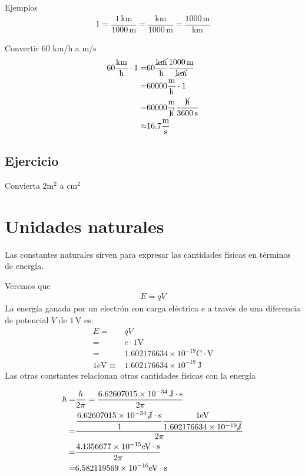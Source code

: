 \documentclass[11pt,a4paper]{book}
\begin{document}
Ejemplos
\begin{align*}
    1=\dfrac{1\,\text{km}}{1000\,\text{m}} = \dfrac{\text{km}}{1000\,\text{m}} =\dfrac{1000\,\text{m}}{\text{km}}
\end{align*}

Convertir 60 km/h a m/s
\begin{align*}
    60\dfrac{\text{km}}{\text{h}}\cdot 1 =& 60\dfrac{\cancel{\text{km}}}{\text{h}}  \dfrac{1000\,\text{m}}{\cancel{\text{km}}}\\
    =& 60000\dfrac{\text{m}}{\text{h}}\cdot 1\\
    =&60000\dfrac{\text{m}}{\cancel{\text{h}}}
    \dfrac{{\cancel{\text{h}}}}{3600\,\text{s}}\\
    \approx& 16.7 \frac{\text{m}}{\text{s}}
\end{align*}


\subsection*{Ejercicio}
Convierta $2\text{m}^2$ a $\text{cm}^2$


\section{Unidades naturales}
Las constantes naturales sirven para expresar las cantidades físicas en términos de energía.


Veremos que
\begin{align}
    E = q V
\end{align}
La energía ganada por un electrón con carga eléctrica $e$ a través de una diferencia de potencial $V$ de $1\,\text{V}$ es:
\begin{align}
    E =&qV\nonumber\\
    =& e\cdot 1\text{V}\nonumber\\
    =&1.602 176 634 \times 10^{-19} \text{C}\cdot\text{V}\nonumber\\
 1\text{eV} \equiv &   1.602 176 634 \times 10^{-19} \,\text{J}
\end{align}
Las otras constantes relacionan otras cantidades físicas con la energía





\begin{align}
    \hbar =&\frac{h}{2\pi} = 
    \frac{6.62607015\times 10^{-34}\,\text{J}\cdot \text{s}}{2\pi}\nonumber\\
    =&\frac{\dfrac{6.62607015\times 10^{-34}\,\cancel{\text{J}}\cdot \text{s}}{1}
    \dfrac{1\text{eV}}{1.602 176 634 \times 10^{-19}\cancel{\text{J}}}
    }{2\pi}\nonumber\\
    =&\frac{4.1356677\times 10^{-15} \text{eV}\cdot\text{s}}{2\pi}\nonumber\\
=&6.582119569\times 10^{-16}\text{eV}\cdot\text{s}
\end{align}
\end{document}

